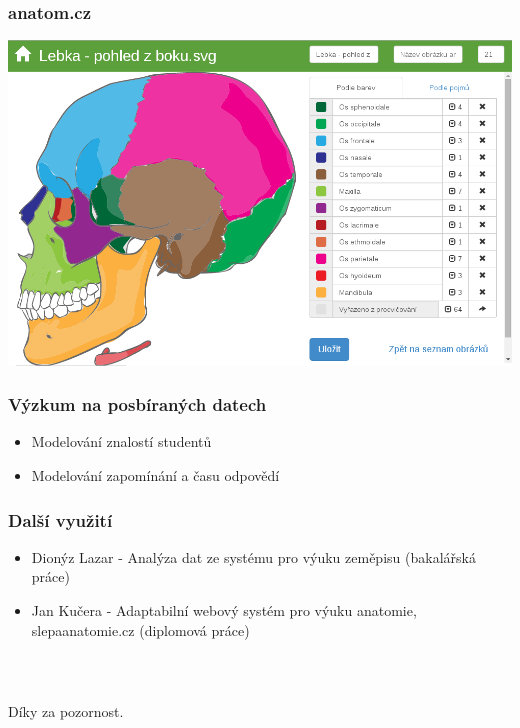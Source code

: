 \documentclass[xcolor=svgnames]{beamer}
\begin{document}
\begin{frame}
	\frametitle{anatom.cz}
	 
   \includegraphics[width=\textwidth]{img/anatomie.png}
\end{frame}
\begin{frame}
	\frametitle{Výzkum na posbíraných datech}

  \begin{itemize}
   \item Modelování znalostí studentů
   \item Modelování zapomínání a času odpovědí
  \end{itemize}

\end{frame}
\begin{frame}
	\frametitle{Další využití}
  \begin{itemize}
  \item Dionýz Lazar - Analýza dat ze systému pro výuku zeměpisu (bakalářská práce)
  \item Jan Kučera - Adaptabilní webový systém pro výuku anatomie, slepaanatomie.cz (diplomová práce)
  \end{itemize}
\end{frame}
\begin{frame}
  \frametitle{~}
\begin{center} 
\huge  Díky za pozornost.
\end{center}
\end{frame}
\end{document}
